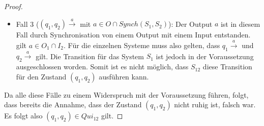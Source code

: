 \begin{proof}
\begin{itemize}
    \item Fall 3 ($(q_1,q_2) \overset{a}{\rightarrow}$ mit $a\in O\cap
      Synch(S_1,S_2)$): Der Output $a$ ist in diesem Fall durch Synchronisation
      von einem Output mit einem Input entstanden. \OBdA{} gilt $a\in O_1\cap
      I_2$. Für die einzelnen Systeme muss also gelten, dass $q_1
      \overset{a}{\rightarrow}$ und $q_2 \overset{a}{\rightarrow}$ gilt. Die
      Transition für das System $S_1$ ist jedoch in der Voraussetzung
      ausgeschlossen worden. Somit ist es nicht möglich, dass $S_{12}$ diese
      Transition für den Zustand $(q_1,q_2)$ ausführen kann.
  \end{itemize}
  Da alle diese Fälle zu einem Widerspruch mit der Voraussetzung führen, folgt,
  dass bereits die Annahme, dass der Zustand $(q_1,q_2)$ nicht ruhig ist,
  falsch war. Es folgt also $(q_1,q_2)\in Qui_{12}$ gilt.


\end{proof}
